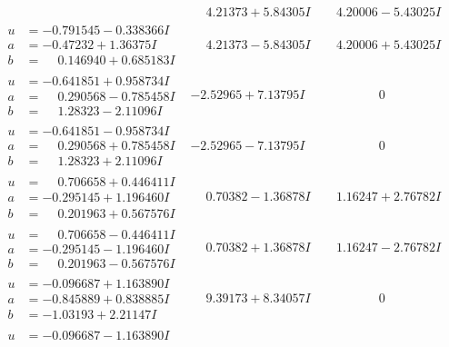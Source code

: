\documentclass[1p]{elsarticle_modified}
\theoremstyle{definition}
\begin{document}
$$\begin{array}{c|c|c}
 & \phantom{-}4.21373 + 5.84305 I & \phantom{-}4.20006 - 5.43025 I \\ \hline\begin{aligned}
u &= -0.791545 - 0.338366 I \\
a &= -0.47232 + 1.36375 I \\
b &= \phantom{-}0.146940 + 0.685183 I\end{aligned}
 & \phantom{-}4.21373 - 5.84305 I & \phantom{-}4.20006 + 5.43025 I \\ \hline\begin{aligned}
u &= -0.641851 + 0.958734 I \\
a &= \phantom{-}0.290568 - 0.785458 I \\
b &= \phantom{-}1.28323 - 2.11096 I\end{aligned}
 & -2.52965 + 7.13795 I & \phantom{-0.000000 } 0 \\ \hline\begin{aligned}
u &= -0.641851 - 0.958734 I \\
a &= \phantom{-}0.290568 + 0.785458 I \\
b &= \phantom{-}1.28323 + 2.11096 I\end{aligned}
 & -2.52965 - 7.13795 I & \phantom{-0.000000 } 0 \\ \hline\begin{aligned}
u &= \phantom{-}0.706658 + 0.446411 I \\
a &= -0.295145 + 1.196460 I \\
b &= \phantom{-}0.201963 + 0.567576 I\end{aligned}
 & \phantom{-}0.70382 - 1.36878 I & \phantom{-}1.16247 + 2.76782 I \\ \hline\begin{aligned}
u &= \phantom{-}0.706658 - 0.446411 I \\
a &= -0.295145 - 1.196460 I \\
b &= \phantom{-}0.201963 - 0.567576 I\end{aligned}
 & \phantom{-}0.70382 + 1.36878 I & \phantom{-}1.16247 - 2.76782 I \\ \hline\begin{aligned}
u &= -0.096687 + 1.163890 I \\
a &= -0.845889 + 0.838885 I \\
b &= -1.03193 + 2.21147 I\end{aligned}
 & \phantom{-}9.39173 + 8.34057 I & \phantom{-0.000000 } 0 \\ \hline\begin{aligned}
u &= -0.096687 - 1.163890 I \\

\end{aligned}
\end{array}$$
\end{document}
